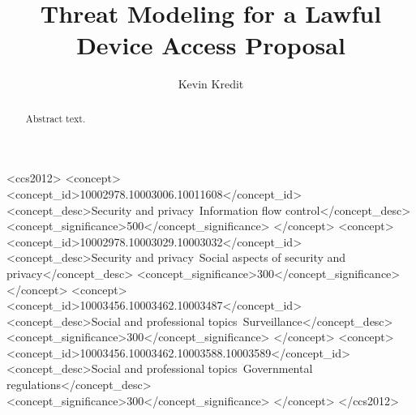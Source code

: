 \documentclass[manuscript,screen,review]{acmart}
\begin{document}
\title{Threat Modeling for a Lawful Device Access Proposal}

\author{Kevin Kredit}

\renewcommand{\shortauthors}{Kredit}

\begin{abstract}
  Abstract text.
\end{abstract}

\begin{CCSXML}
<ccs2012>
  <concept>
    <concept_id>10002978.10003006.10011608</concept_id>
    <concept_desc>Security and privacy~Information flow control</concept_desc>
    <concept_significance>500</concept_significance>
  </concept>
  <concept>
    <concept_id>10002978.10003029.10003032</concept_id>
    <concept_desc>Security and privacy~Social aspects of security and privacy</concept_desc>
    <concept_significance>300</concept_significance>
  </concept>
    <concept>
    <concept_id>10003456.10003462.10003487</concept_id>
    <concept_desc>Social and professional topics~Surveillance</concept_desc>
    <concept_significance>300</concept_significance>
  </concept>
  <concept>
    <concept_id>10003456.10003462.10003588.10003589</concept_id>
    <concept_desc>Social and professional topics~Governmental regulations</concept_desc>
    <concept_significance>300</concept_significance>
  </concept>
</ccs2012>
\end{CCSXML}
\end{document}
